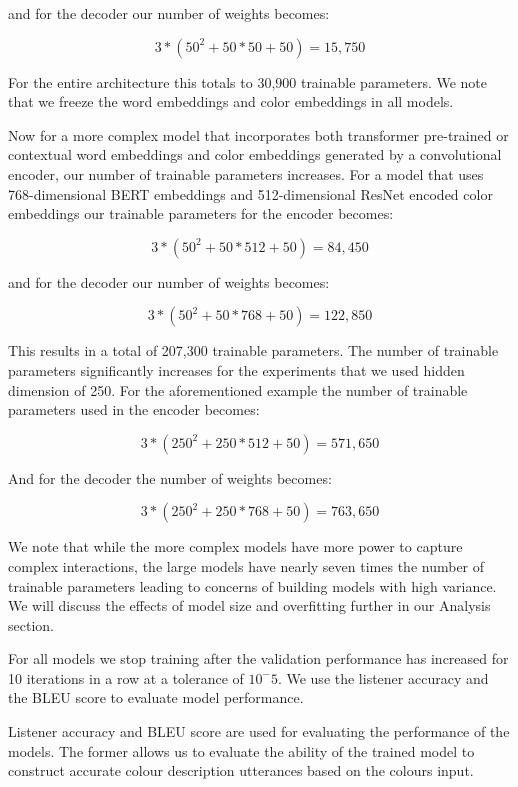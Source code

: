 \par
and for the decoder our number of weights becomes:

\[3*(50^2 + 50*50 +50) = 15,750\]

\par
For the entire architecture this totals to 30,900 trainable parameters. We note that we freeze the word embeddings and color embeddings in all models.

\par
Now for a more complex model that incorporates both transformer pre-trained or contextual word embeddings and color embeddings generated by a convolutional encoder, our number of trainable parameters increases. For a model that uses 768-dimensional BERT embeddings and 512-dimensional ResNet encoded color embeddings our trainable parameters for the encoder becomes:

\[3*(50^2 + 50*512 +50) = 84,450\]

\par
and for the decoder our number of weights becomes:

\[3*(50^2 + 50*768 +50) = 122,850\]

\par
This results in a total of 207,300 trainable parameters. The number of trainable parameters significantly increases for the experiments that we used hidden dimension of 250. For the aforementioned example the number of trainable parameters used in the encoder becomes:

\[3*(250^2 + 250*512 +50) = 571,650\]

\par
And for the decoder the number of weights becomes:

\[3*(250^2 + 250*768 +50) = 763,650\]

\par
We note that while the more complex models have more power to capture complex interactions, the large models have nearly seven times the number of trainable parameters leading to concerns of building models with high variance. We will discuss the effects of model size and overfitting further in our Analysis section.

\par
For all models we stop training after the validation performance has increased for 10 iterations in a row at a tolerance of \(10^-5\). We use the listener accuracy and the BLEU score to evaluate model performance.

\par
Listener accuracy and BLEU score are used for evaluating the performance of the models. The former allows us to evaluate the ability of the trained model to construct accurate colour description utterances based on the colours input.

